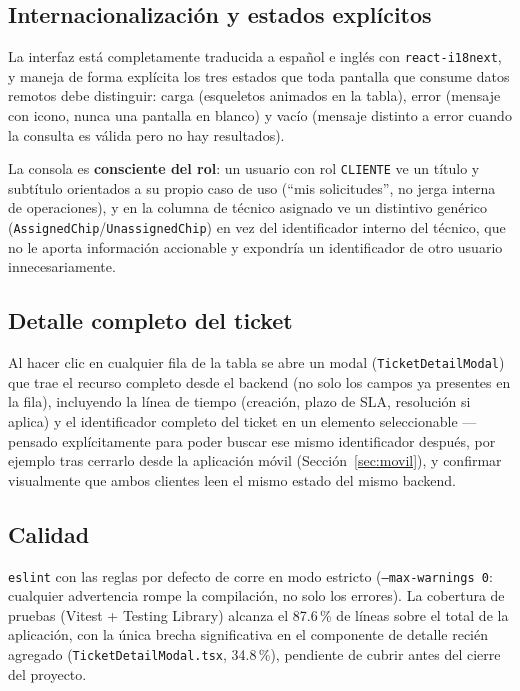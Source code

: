 \subsection{Internacionalización y estados explícitos}

La interfaz está completamente traducida a español e inglés con \texttt{react-i18next}, y
maneja de forma explícita los tres estados que toda pantalla que consume datos remotos debe
distinguir: carga (esqueletos animados en la tabla), error (mensaje con icono, nunca una pantalla
en blanco) y vacío (mensaje distinto a error cuando la consulta es válida pero no hay resultados).

La consola es \textbf{consciente del rol}: un usuario con rol \texttt{CLIENTE} ve un título y
subtítulo orientados a su propio caso de uso (``mis solicitudes'', no jerga interna de
operaciones), y en la columna de técnico asignado ve un distintivo genérico
(\texttt{AssignedChip}/\texttt{UnassignedChip}) en vez del identificador interno del técnico, que
no le aporta información accionable y expondría un identificador de otro usuario innecesariamente.

\subsection{Detalle completo del ticket}

Al hacer clic en cualquier fila de la tabla se abre un modal (\texttt{TicketDetailModal}) que
trae el recurso completo desde el backend (no solo los campos ya presentes en la fila),
incluyendo la línea de tiempo (creación, plazo de SLA, resolución si aplica) y el identificador
completo del ticket en un elemento seleccionable —pensado explícitamente para poder buscar ese
mismo identificador después, por ejemplo tras cerrarlo desde la aplicación móvil
(Sección~\ref{sec:movil}), y confirmar visualmente que ambos clientes leen el mismo estado del
mismo backend.

\subsection{Calidad}

\texttt{eslint} con las reglas por defecto de \texttt{} corre en modo estricto
(\texttt{--max-warnings 0}: cualquier advertencia rompe la compilación, no solo los errores). La
cobertura de pruebas (Vitest + Testing Library) alcanza el 87.6\,\% de líneas sobre el total de la
aplicación, con la única brecha significativa en el componente de detalle recién agregado
(\texttt{TicketDetailModal.tsx}, 34.8\,\%), pendiente de cubrir antes del cierre del proyecto.
